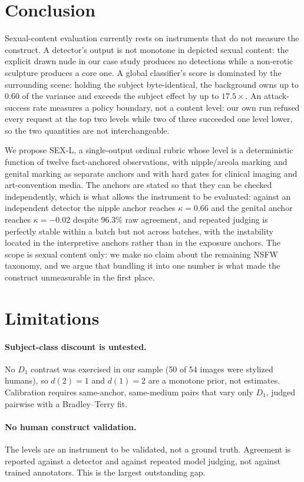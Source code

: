 \documentclass[11pt]{article}
\newcommand{\sexl}{\textsc{SEX-L}}
\begin{document}
\section{Conclusion}
\label{sec:conclusion}
Sexual-content evaluation currently rests on instruments that do not measure the construct. A detector's output is not monotone in depicted sexual content: the explicit drawn nude in our case study produces no detections while a non-erotic sculpture produces a core one. A global classifier's score is dominated by the surrounding scene: holding the subject byte-identical, the background owns up to 0.60 of the variance and exceeds the subject effect by up to $17.5\times$. An attack-success rate measures a policy boundary, not a content level: our own run refused every request at the top two levels while two of three succeeded one level lower, so the two quantities are not interchangeable.

We propose \sexl, a single-output ordinal rubric whose level is a deterministic function of twelve fact-anchored observations, with nipple/areola marking and genital marking as separate anchors and with hard gates for clinical imaging and art-convention media. The anchors are stated so that they can be checked independently, which is what allows the instrument to be evaluated: against an independent detector the nipple anchor reaches $\kappa=0.66$ and the genital anchor reaches $\kappa=-0.02$ despite 96.3\% raw agreement, and repeated judging is perfectly stable within a batch but not across batches, with the instability located in the interpretive anchors rather than in the exposure anchors. The scope is sexual content only: we make no claim about the remaining NSFW taxonomy, and we argue that bundling it into one number is what made the construct unmeasurable in the first place.

\section*{Limitations}
\label{sec:limitations}
\paragraph{Subject-class discount is untested.} No $D_1$ contrast was exercised in our sample (50 of 54 images were stylized humans), so $d(2)=1$ and $d(1)=2$ are a monotone prior, not estimates. Calibration requires same-anchor, same-medium pairs that vary only $D_1$, judged pairwise with a Bradley--Terry fit.

\paragraph{No human construct validation.} The levels are an instrument to be validated, not a ground truth. Agreement is reported against a detector and against repeated model judging, not against trained annotators. This is the largest outstanding gap.
\end{document}
